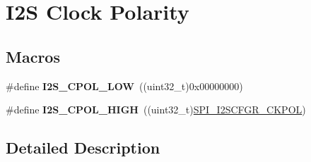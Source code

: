 \hypertarget{group___i2_s___clock___polarity}{}\section{I2S Clock Polarity}
\label{group___i2_s___clock___polarity}
\subsection*{Macros}
\begin{DoxyCompactItemize}
\item 
\#define {\bfseries I2\+S\+\_\+\+C\+P\+O\+L\+\_\+\+L\+OW}~((uint32\+\_\+t)0x00000000)\hypertarget{group___i2_s___clock___polarity_gad930e30055218df3f34d9ab96d31a3f4}{}\label{group___i2_s___clock___polarity_gad930e30055218df3f34d9ab96d31a3f4}

\item 
\#define {\bfseries I2\+S\+\_\+\+C\+P\+O\+L\+\_\+\+H\+I\+GH}~((uint32\+\_\+t)\hyperlink{group___peripheral___registers___bits___definition_ga5c5be1f1c8b4689643e04cd5034e7f5f}{S\+P\+I\+\_\+\+I2\+S\+C\+F\+G\+R\+\_\+\+C\+K\+P\+OL})\hypertarget{group___i2_s___clock___polarity_gab86bbe2d41b941d9949868ca3578e607}{}\label{group___i2_s___clock___polarity_gab86bbe2d41b941d9949868ca3578e607}

\end{DoxyCompactItemize}


\subsection{Detailed Description}
